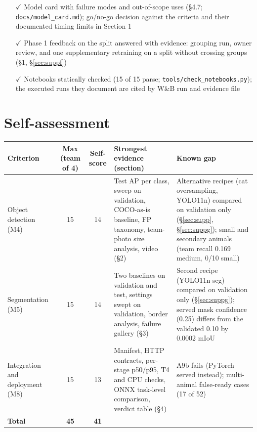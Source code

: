 \documentclass[11pt,a4paper]{article}
\begin{document}
\begin{itemize}[leftmargin=1.6em,itemsep=2pt]
  \item[$\checkmark$] Model card with failure modes and out-of-scope uses (\S4.7; \texttt{docs/model\_card.md}); go/no-go decision against the criteria and their documented timing limits in Section 1
  \item[$\checkmark$] Phase 1 feedback on the split answered with evidence: grouping run, owner review, and one supplementary retraining on a split without crossing groups (\S1, \S\ref{sec:suppf})
  \item[$\checkmark$] Notebooks statically checked (15 of 15 parse; \texttt{tools/check\_notebooks.py}); the executed runs they document are cited by W\&B run and evidence file
\end{itemize}

\section{Self-assessment}

{\small
\begin{tabularx}{\linewidth}{@{}P{2.6cm} c c Y P{4.2cm}@{}}
\toprule
Criterion & Max (team of 4) & Self-score & Strongest evidence (section) & Known gap \\
\midrule
Object detection (M4) & 15 & 14 & Test AP per class, sweep on validation, COCO-as-is baseline, FP taxonomy, team-photo size analysis, video (\S2) & Alternative recipes (cat oversampling, YOLO11n) compared on validation only (\S\ref{sec:supp}, \S\ref{sec:suppg}); small and secondary animals (team recall 0.169 medium, 0/10 small) \\
Segmentation (M5) & 15 & 14 & Two baselines on validation and test, settings swept on validation, border analysis, failure gallery (\S3) & Second recipe (YOLO11n-seg) compared on validation only (\S\ref{sec:suppg}); served mask confidence (0.25) differs from the validated 0.10 by 0.0002 mIoU \\
Integration and deployment (M8) & 15 & 13 & Manifest, HTTP contracts, per-stage p50/p95, T4 and CPU checks, ONNX task-level comparison, verdict table (\S4) & A9b fails (PyTorch served instead); multi-animal false-ready cases (17 of 52) \\
\midrule
\textbf{Total} & \textbf{45} & \textbf{41} & & \\
\bottomrule
\end{tabularx}}
\end{document}
